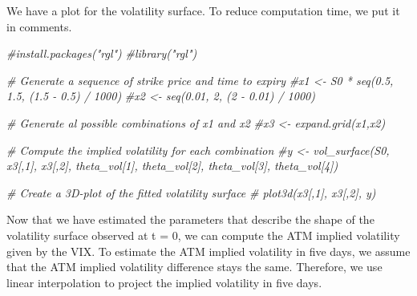 \documentclass[]{article}
\newenvironment{Shaded}{\begin{snugshade}}{\end{snugshade}}
\newcommand{\CommentTok}[1]{\textcolor[rgb]{0.56,0.35,0.01}{\textit{#1}}}
\newcommand{\DataTypeTok}[1]{\textcolor[rgb]{0.13,0.29,0.53}{#1}}
\newcommand{\DecValTok}[1]{\textcolor[rgb]{0.00,0.00,0.81}{#1}}
\newcommand{\FloatTok}[1]{\textcolor[rgb]{0.00,0.00,0.81}{#1}}
\newcommand{\KeywordTok}[1]{\textcolor[rgb]{0.13,0.29,0.53}{\textbf{#1}}}
\newcommand{\NormalTok}[1]{#1}
\newcommand{\OperatorTok}[1]{\textcolor[rgb]{0.81,0.36,0.00}{\textbf{#1}}}
\newcommand{\StringTok}[1]{\textcolor[rgb]{0.31,0.60,0.02}{#1}}
\begin{document}
\begin{Shaded}
\end{Shaded}

We have a plot for the volatility surface. To reduce computation time,
we put it in comments.

\begin{Shaded}
\begin{Highlighting}[]
\CommentTok{\#install.packages("rgl")}
\CommentTok{\#library("rgl")}

\CommentTok{\# Generate a sequence of strike price and time to expiry}
\CommentTok{\#x1 <{-} S0 * seq(0.5, 1.5, (1.5 {-} 0.5) / 1000)}
\CommentTok{\#x2 <{-} seq(0.01, 2, (2 {-} 0.01) / 1000)}

\CommentTok{\# Generate al possible combinations of \textquotesingle{}x1\textquotesingle{} and \textquotesingle{}x2\textquotesingle{}}
\CommentTok{\#x3 <{-} expand.grid(x1,x2)}

\CommentTok{\# Compute the implied volatility for each combination}
\CommentTok{\#y  <{-} vol\_surface(S0, x3[,1], x3[,2], theta\_vol[1], theta\_vol[2], theta\_vol[3], theta\_vol[4])}

\CommentTok{\# Create a 3D{-}plot of the fitted volatility surface}
\CommentTok{\# plot3d(x3[,1], x3[,2], y)}
\end{Highlighting}
\end{Shaded}

Now that we have estimated the parameters that describe the shape of the
volatility surface observed at t = 0, we can compute the ATM implied
volatility given by the VIX. To estimate the ATM implied volatility in
five days, we assume that the ATM implied volatility difference stays
the same. Therefore, we use linear interpolation to project the implied
volatility in five days.
\end{document}
